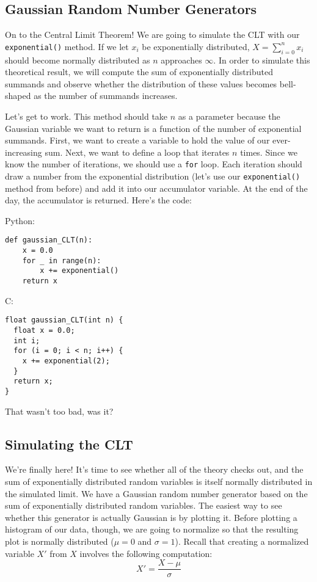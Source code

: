 \documentclass[a4paper]{article}
\begin{document}
\subsection{Gaussian Random Number Generators}

On to the Central Limit Theorem! We are going to simulate the CLT with our \texttt{exponential()} method. If we let $x_i$ be exponentially distributed, $X = \sum_{i=0}^n x_i$ should become normally distributed as $n$ approaches $\infty$. In order to simulate this theoretical result, we will compute the sum of exponentially distributed summands and observe whether the distribution of these values becomes bell-shaped as the number of summands increases.

Let's get to work. This method should take $n$ as a parameter because the Gaussian variable we want to return is a function of the number of exponential summands. First, we want to create a variable to hold the value of our ever-increasing sum. Next, we want to define a loop that iterates $n$ times. Since we know the number of iterations, we should use a \texttt{for} loop. Each iteration should draw a number from the exponential distribution (let's use our \texttt{exponential()} method from before) and add it into our accumulator variable. At the end of the day, the accumulator is returned. Here's the code:

Python:
\begin{verbatim}
def gaussian_CLT(n):
    x = 0.0
    for _ in range(n):
        x += exponential()
    return x
\end{verbatim}


C:
\begin{verbatim}
float gaussian_CLT(int n) {
  float x = 0.0;
  int i;
  for (i = 0; i < n; i++) {
    x += exponential(2);
  }
  return x;
}
\end{verbatim}

That wasn't too bad, was it?


\subsection{Simulating the CLT}
We're finally here! It's time to see whether all of the theory checks out, and the sum of exponentially distributed random variables is itself normally distributed in the simulated limit. We have a Gaussian random number generator based on the sum of exponentially distributed random variables. The easiest way to see whether this generator is actually Gaussian is by plotting it. Before plotting a histogram of our data, though, we are going to normalize so that the resulting plot is normally distributed ($\mu = 0$ and $\sigma = 1$). Recall that creating a normalized variable $X'$ from $X$ involves the following computation:
\[ X' = \frac{X - \mu}{\sigma}\]
\end{document}
